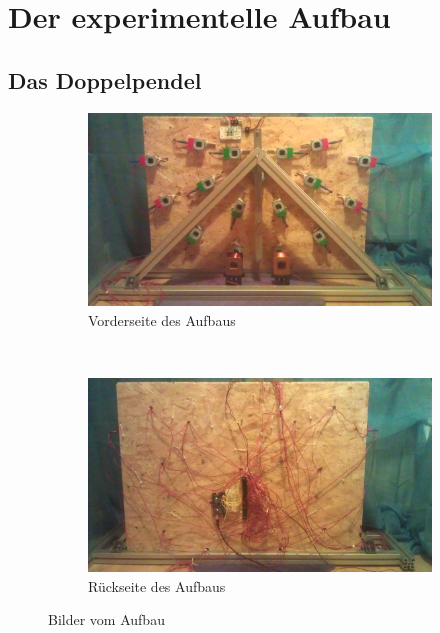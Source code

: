 
\section{Der experimentelle Aufbau}

\subsection{Das Doppelpendel}

\begin{figure}
  \centering
  \begin{subfigure}{0.49\textwidth}
    \centering
    \includegraphics[width=\textwidth]{images/real_front.jpg}
    \caption{Vorderseite des Aufbaus}
    \label{fig:front}
  \end{subfigure}
  ~
  \begin{subfigure}{0.49\textwidth}
    \centering
    \includegraphics[width=\textwidth]{images/real_back.jpg}
    \caption{Rückseite des Aufbaus}
    \label{fig:back}
  \end{subfigure}
  \caption{Bilder vom Aufbau}
  \label{fig:aufbau}
\end{figure}

